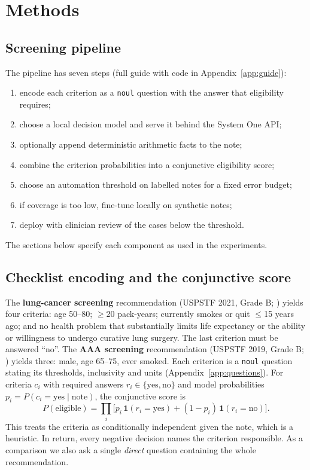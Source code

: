 \documentclass[11pt]{article}
\begin{document}
\section{Methods}
\label{sec:methods}

\subsection{Screening pipeline}
\label{sec:pipeline}
The pipeline has seven steps (full guide with code in Appendix~\ref{app:guide}):
\begin{enumerate}[nosep]
\item encode each criterion as a \texttt{noul} question with the answer that eligibility requires;
\item choose a local decision model and serve it behind the System One API;
\item optionally append deterministic arithmetic facts to the note;
\item combine the criterion probabilities into a conjunctive eligibility score;
\item choose an automation threshold on labelled notes for a fixed error budget;
\item if coverage is too low, fine-tune locally on synthetic notes;
\item deploy with clinician review of the cases below the threshold.
\end{enumerate}
The sections below specify each component as used in the experiments.

\subsection{Checklist encoding and the conjunctive score}
\label{sec:encoding}
The \textbf{lung-cancer screening} recommendation (USPSTF 2021, Grade B; \citealp{krist2021lung}) yields four criteria: age 50--80; $\geq$20 pack-years; currently smokes or quit $\leq$15 years ago; and no health problem that substantially limits life expectancy or the ability or willingness to undergo curative lung surgery. The last criterion must be answered ``no''.
The \textbf{AAA screening} recommendation (USPSTF 2019, Grade B; \citealp{owens2019aaa}) yields three: male, age 65--75, ever smoked.
Each criterion is a \texttt{noul} question stating its thresholds, inclusivity and units (Appendix~\ref{app:questions}).
For criteria $c_i$ with required answers $r_i\in\{\text{yes},\text{no}\}$ and model probabilities $p_i=P(c_i=\text{yes}\mid\text{note})$, the conjunctive score is
\begin{equation}
P(\text{eligible}) = \textstyle\prod_i \big[p_i\,\mathbf{1}(r_i=\text{yes}) + (1-p_i)\,\mathbf{1}(r_i=\text{no})\big].
\label{eq:and}
\end{equation}
This treats the criteria as conditionally independent given the note, which is a heuristic. In return, every negative decision names the criterion responsible.
As a comparison we also ask a single \emph{direct} question containing the whole recommendation.
\end{document}
